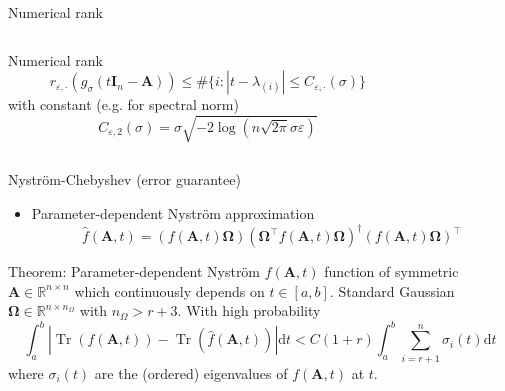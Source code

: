 \documentclass[aspectratio=169, leqno, 12pt]{beamer}
\newcommand{\mtx}[1]{\boldsymbol{#1}}
\DeclareMathOperator{\Tr}{Tr}
\begin{document}
\begin{frame}{Numerical rank}
    \begin{columns}
        \begin{column}{0.55\textwidth}
            Numerical rank
            \begin{equation}
                r_{\varepsilon, \cdot}(g_{\sigma}(t\mtx{I}_n - \mtx{A})) \leq \#\{i: |t - \lambda_{(i)}| \leq C_{\varepsilon, \cdot}(\sigma)\}
            \end{equation}
            with constant (e.g. for spectral norm)
            \begin{equation}
                C_{\varepsilon, 2}(\sigma) = \sigma \sqrt{-2 \log(n \sqrt{2 \pi} \sigma \varepsilon)}
            \end{equation}
        \end{column}
        \begin{column}{0.45\textwidth}
            \scalebox{0.6}{}
        \end{column}
    \end{columns}
    \centering
    \scalebox{1.0}{}
\end{frame}

\begin{frame}{Nystr\"om-Chebyshev (error guarantee)}
    \begin{itemize}
        \item Parameter-dependent Nystr\"om approximation
        \begin{equation}
            \widehat{f}(\mtx{A}, t) = (f(\mtx{A}, t) \mtx{\Omega}) (\mtx{\Omega}^{\top} f(\mtx{A}, t) \mtx{\Omega})^{\dagger} (f(\mtx{A}, t) \mtx{\Omega})^{\top}
        \end{equation}
    \end{itemize}
    \begin{block}{Theorem: Parameter-dependent Nystr\"om \cite{he2023parameter}}
        $f(\mtx{A}, t)$ function of symmetric $\mtx{A} \in \mathbb{R}^{n \times n}$ which
        continuously depends on $t \in [a,b]$. 
        Standard Gaussian $\mtx{\Omega} \in \mathbb{R}^{n \times n_{\Omega}}$
        with $n_{\Omega} > r + 3$. With high probability
        \begin{equation}
            \int_{a}^{b} | \Tr(f(\mtx{A}, t)) - \Tr(\widehat{f}(\mtx{A}, t))| \mathrm{d}t
                < C (1 + r) \int_{a}^{b} \sum_{i = r+1}^n \sigma_i(t) \mathrm{d}t
        \end{equation}
        where $\sigma_i(t)$ are the (ordered) eigenvalues of $f(\mtx{A}, t)$ at $t$.
    \end{block}
\end{frame}
\end{document}
